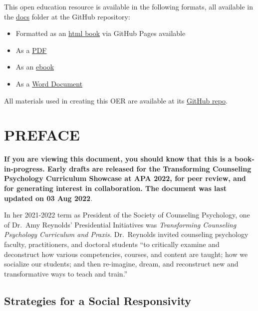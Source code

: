 \documentclass[
  11pt,
]{book}
\providecommand{\tightlist}{%
  \setlength{\itemsep}{0pt}\setlength{\parskip}{0pt}}
\begin{document}
This open education resource is available in the following formats, all available in the \href{https://github.com/lhbikos/TransformingResearchMethods/tree/main/docs}{docs} folder at the GitHub repository:

\begin{itemize}
\tightlist
\item
  Formatted as an \href{https://lhbikos.github.io/TransformingResearchMethods/}{html book} via GitHub Pages available
\item
  As a \href{https://github.com/lhbikos/TransformingResearchMethods/blob/main/docs/TransformingResearchMethods.pdf}{PDF}
\item
  As an \href{https://github.com/lhbikos/TransformingResearchMethods/blob/main/docs/TransformingResearchMethods.epub}{ebook}
\item
  As a \href{https://github.com/lhbikos/TransformingResearchMethods/blob/main/docs/TransformingResearchMethods.docx}{Word Document}
\end{itemize}

All materials used in creating this OER are available at its \href{https://github.com/lhbikos/TransformingResearchMethods}{GitHub repo}.

\hypertarget{preface}{%
\chapter*{PREFACE}\label{preface}}

\textbf{If you are viewing this document, you should know that this is a book-in-progress. Early drafts are released for the Transforming Counseling Psychology Curriculum Showcase at APA 2022, for peer review, and for generating interest in collaboration. The document was last updated on 03 Aug 2022}.

In her 2021-2022 term as President of the Society of Counseling Psychology, one of Dr.~Amy Reynolds' Presidential Initiatives was \emph{Transforming Counseling Psychology Curriculum and Praxis.} Dr.~Reynolds invited counseling psychology faculty, practitioners, and doctoral students ``to critically examine and deconstruct how various competencies, courses, and content are taught; how we socialize our students; and then re-imagine, dream, and reconstruct new and transformative ways to teach and train.''

\hypertarget{strategies-for-a-social-responsivity}{%
\section*{Strategies for a Social Responsivity}\label{strategies-for-a-social-responsivity}}
\end{document}
